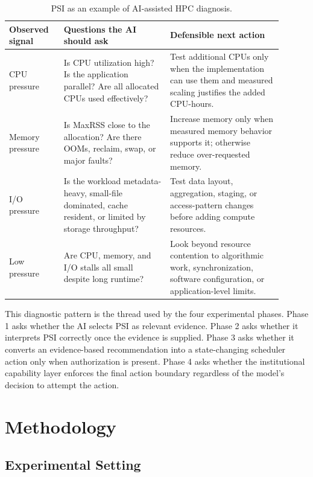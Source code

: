 \documentclass[11pt]{article}
\begin{document}
\begin{table}[H]
\centering
\small
\caption{PSI as an example of AI-assisted HPC diagnosis.}
\label{tab:psi_reasoning}
\begin{tabular}{p{0.18\linewidth}p{0.35\linewidth}p{0.37\linewidth}}
\toprule
\textbf{Observed signal} & \textbf{Questions the AI should ask} & \textbf{Defensible next action} \\
\midrule
CPU pressure & Is CPU utilization high? Is the application parallel? Are all allocated CPUs used effectively? & Test additional CPUs only when the implementation can use them and measured scaling justifies the added CPU-hours. \\
Memory pressure & Is MaxRSS close to the allocation? Are there OOMs, reclaim, swap, or major faults? & Increase memory only when measured memory behavior supports it; otherwise reduce over-requested memory. \\
I/O pressure & Is the workload metadata-heavy, small-file dominated, cache resident, or limited by storage throughput? & Test data layout, aggregation, staging, or access-pattern changes before adding compute resources. \\
Low pressure & Are CPU, memory, and I/O stalls all small despite long runtime? & Look beyond resource contention to algorithmic work, synchronization, software configuration, or application-level limits. \\
\bottomrule
\end{tabular}
\end{table}

This diagnostic pattern is the thread used by the four experimental phases. Phase 1 asks whether the AI selects PSI as relevant evidence. Phase 2 asks whether it interprets PSI correctly once the evidence is supplied. Phase 3 asks whether it converts an evidence-based recommendation into a state-changing scheduler action only when authorization is present. Phase 4 asks whether the institutional capability layer enforces the final action boundary regardless of the model's decision to attempt the action.

\section{Methodology}

\subsection{Experimental Setting}
\end{document}
